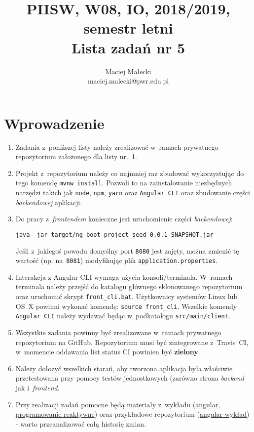\documentclass[12pt]{article}
\title{PIISW, W08, IO, 2018/2019, semestr letni\\Lista zadań nr 5}
\author{Maciej Małecki\\ \small maciej.malecki@pwr.edu.pl}
\begin{document}
    \maketitle

    \section*{Wprowadzenie}
        \begin{enumerate}
            \item Zadania z~poniższej listy należy zrealizować w~ramach prywatnego repozytorium założonego dla listy nr.~1.
            \item Projekt z~repozytorium należy co najmniej raz zbudować wykorzystując do tego komendę \texttt{mvnw install}. Pozwoli to na zainstalowanie niezbędnych narzędzi takich jak \texttt{node}, \texttt{npm}, \texttt{yarn} oraz \texttt{Angular CLI} oraz zbudowanie części \textit{backendowej} aplikacji.
            \item
                Do pracy z~\textit{frontendem} konieczne jest uruchomienie części \textit{backendowej}:
                \begin{verbatim}
java -jar target/ng-boot-project-seed-0.0.1-SNAPSHOT.jar
                \end{verbatim}
                Jeśli z~jakiegoś powodu domyślny port \texttt{8080} jest zajęty, można zmienić tę wartość (np. na~\texttt{8081}) modyfikując plik \texttt{application.properties}.
            \item Interakcja z Angular CLI wymaga użycia konsoli/terminala. W~ramach terminala należy przejść do katalogu głównego sklonowanego repozytorium oraz uruchomić skrypt \texttt{front\_cli.bat}. Użytkownicy systemów Linux lub OS~X powinni wykonać komendę: \texttt{source front\_\allowbreak cli}.
                Wszelkie komendy \texttt{Angular CLI} należy wydawać będąc w~podkatalogu \texttt{src/main/client}.
            \item Wszystkie zadania powinny być zrealizowane w~ramach prywatnego repozytorium na GitHub. Repozytorium musi być zintegrowane z~Travis~CI, w~momencie oddawania list status CI powinien być \textbf{zielony}.
            \item Należy dołożyć wszelkich starań, aby tworzona aplikacja była właściwie przetestowana przy pomocy testów jednostkowych (zarówno strona \textit{backend} jak i~\textit{frontend}.
            \item Przy realizacji zadań pomocne będą materiały z~wykładu (\href{https://pwr-piisw.github.io/wyklady/angular_1.html#/}{angular}, \href{https://pwr-piisw.github.io/wyklady/reactive.html#/}{programowanie reaktywne}) oraz przykładowe repozytorium (\href{https://github.com/pwr-piisw/angular-wyklad}{angular-wykład}) - warto przeanalizować całą historię zmian.

\end{enumerate}
\end{document}
